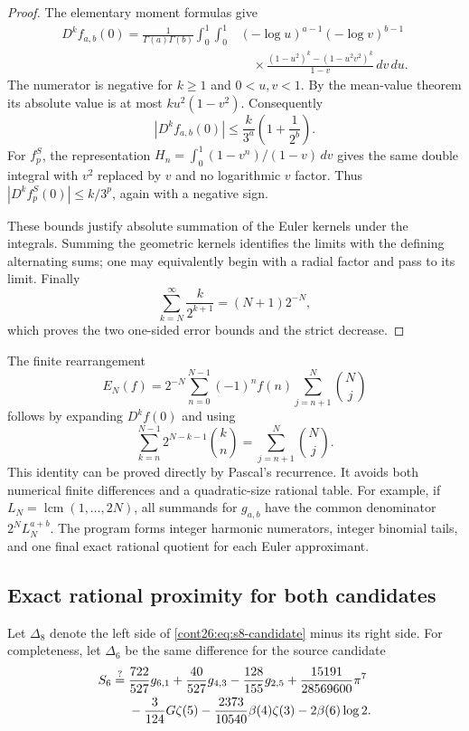 \documentclass[11pt,letterpaper]{article}
\numberwithin{equation}{section}
\theoremstyle{plain}
\theoremstyle{definition}
\theoremstyle{remark}
\begin{document}
\begin{proof}
The elementary moment formulas give
\begin{align*}
 D^kf_{a,b}(0)
 =\frac1{\Gamma(a)\Gamma(b)}
 \int_0^1\int_0^1
 &(-\log u)^{a-1}(-\log v)^{b-1}\\[-0.5em]
 &\quad\times
 \frac{(1-u^2)^k-(1-u^2v^2)^k}{1-v}\,dv\,du.
\end{align*}
The numerator is negative for $k\geq1$ and $0<u,v<1$. By the
mean-value theorem its absolute value is at most
$ku^2(1-v^2)$. Consequently
\[
 |D^kf_{a,b}(0)|
 \leq \frac{k}{3^a}\left(1+\frac1{2^b}\right).
\]
For $f_p^S$, the representation
$H_n=\int_0^1(1-v^n)/(1-v)\,dv$ gives the same double integral
with $v^2$ replaced by $v$ and no logarithmic $v$ factor. Thus
$|D^kf_p^S(0)|\leq k/3^p$, again with a negative sign.

These bounds justify absolute summation of the Euler kernels under
the integrals. Summing the geometric kernels identifies the limits with
the defining alternating sums; one may equivalently begin with a radial
factor and pass to its limit. Finally
\[
 \sum_{k=N}^{\infty}\frac{k}{2^{k+1}}=(N+1)2^{-N},
\]
which proves the two one-sided error bounds and the strict decrease.
\end{proof}

The finite rearrangement
\begin{equation}\label{cont26:eq:s8-euler-weights}
 E_N(f)=2^{-N}\sum_{n=0}^{N-1}(-1)^n f(n)
             \sum_{j=n+1}^N\binom Nj
\end{equation}
follows by expanding $D^kf(0)$ and using
\[
 \sum_{k=n}^{N-1}2^{N-k-1}\binom kn
 =\sum_{j=n+1}^N\binom Nj.
\]
This identity can be proved directly by Pascal's recurrence. It avoids
both numerical finite differences and a quadratic-size rational table.
For example, if $L_N=\operatorname{lcm}(1,\ldots,2N)$, all summands for
$g_{a,b}$ have the common denominator $2^NL_N^{a+b}$.
The program forms integer harmonic numerators, integer binomial tails,
and one final exact rational quotient for each Euler approximant.

\subsection{Exact rational proximity for both candidates}
Let $\Delta_8$ denote the left side of \eqref{cont26:eq:s8-candidate} minus
its right side. For completeness, let $\Delta_6$ be the same difference
for the source candidate
\begin{align}
 S_6\stackrel{?}={}&\frac{722}{527}g_{6,1}
  +\frac{40}{527}g_{4,3}-\frac{128}{155}g_{2,5}
  +\frac{15191}{28569600}\pi^7\notag\\
 &-\frac3{124}G\zeta(5)
  -\frac{2373}{10540}\beta(4)\zeta(3)
  -2\beta(6)\log2.
 \label{cont26:eq:s6-recalled}
\end{align}
\end{document}
